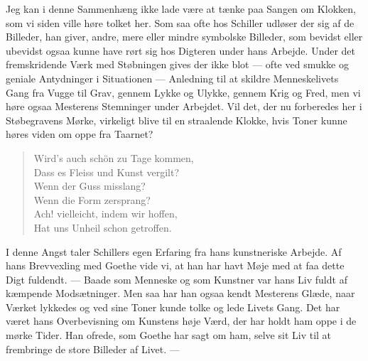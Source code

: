 \documentclass[12pt,a4paper,openany]{book}
\newcommand{\opage}[1]{\marginnote{\footnotesize\textit{[#1]}}}
\begin{document}
Jeg kan i denne Sammenhæng ikke lade være at tænke
\setcounter{footnote}{0}%
\opage{181}paa Sangen om Klokken, som vi siden ville høre tolket her.
Som saa ofte hos Schiller udløser der sig af de Billeder, han
giver, andre, mere eller mindre symbolske Billeder, som bevidst
eller ubevidst ogsaa kunne have rørt sig hos Digteren
under hans Arbejde. Under det fremskridende Værk med
Støbningen gives der ikke blot --- ofte ved smukke og geniale
Antydninger i Situationen --- Anledning til at skildre Menneskelivets
Gang fra Vugge til Grav, gennem Lykke og Ulykke,
gennem Krig og Fred, men vi høre ogsaa Mesterens Stemninger
under Arbejdet. Vil det, der nu forberedes her i Støbegravens
Mørke, virkeligt blive til en straalende Klokke, hvis
Toner kunne høres viden om oppe fra Taarnet?

\begin{quote}
Wird’s auch schön zu Tage kommen,\\
Dass es Fleiss und Kunst vergilt?\\
Wenn der Guss misslang?\\
Wenn die Form zersprang?\\
Ach! vielleicht, indem wir hoffen,\\
Hat uns Unheil schon getroffen.
\end{quote}

I denne Angst taler Schillers egen Erfaring fra hans kunstneriske
Arbejde. Af hans Brevvexling med Goethe vide vi, at
han har havt Møje med at faa dette Digt fuldendt. --- Baade
som Menneske og som Kunstner var hans Liv fuldt af kæmpende
Modsætninger. Men saa har han ogsaa kendt Mesterens
Glæde, naar Værket lykkedes og ved sine Toner kunde tolke
og lede Livets Gang. Det har været hans Overbevisning om
Kunstens høje Værd, der har holdt ham oppe i de mørke Tider.
Han ofrede, som Goethe har sagt om ham, selve sit Liv
til at frembringe de store Billeder af Livet. ---
\end{document}

